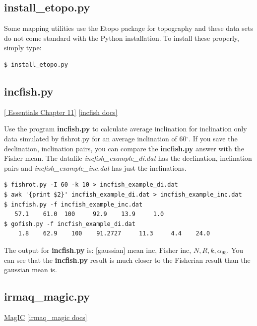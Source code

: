 \documentclass[11pt]{book}
\begin{document}
{{

\subsection{install\_etopo.py}

Some  mapping utilities use the Etopo package for topography and these data sets do not come standard with the Python installation.  To install these properly, simply type:

\begin{verbatim}
$ install_etopo.py
\end{verbatim}







\subsection{incfish.py}
\href{http://earthref.org/MAGIC/books/Tauxe/Essentials/WebBook3ch11.html#ch11}{ [ Essentials Chapter 11]}
\href{https://github.com/PmagPy/PmagPy/blob/master/programs/incfish.py}{[incfish docs]}

Use the program {\bf incfish.py} to calculate average inclination for inclination only data
simulated by fishrot.py for an average inclination of 60$^{\circ}$.   If you save the declination, inclination
pairs, you can compare the {\bf incfish.py} answer with the Fisher mean.    The datafile {\it incfish\_example\_di.dat} has the declination, inclination pairs and {\it incfish\_example\_inc.dat} has just the inclinations.

\begin{verbatim}
$ fishrot.py -I 60 -k 10 > incfish_example_di.dat
$ awk '{print $2}' incfish_example_di.dat > incfish_example_inc.dat
$ incfish.py -f incfish_example_inc.dat
   57.1    61.0  100     92.9    13.9     1.0
$ gofish.py -f incfish_example_di.dat
    1.8    62.9    100    91.2727     11.3     4.4    24.0
\end{verbatim}

The output for {\bf incfish.py} is:  [gaussian] mean inc, Fisher inc, $N, R, k, \alpha_{95}$.  You can see that the {\bf incfish.py} result is much closer to the Fisherian result than the gaussian mean is.

\subsection{irmaq\_magic.py}
\href{#MagIC}{MagIC}
\href{https://github.com/PmagPy/PmagPy/blob/master/programs/irmaq_magic.py}{[irmaq\_magic docs]}

}}
\end{document}
